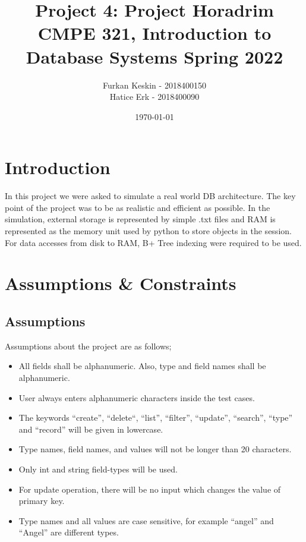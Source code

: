 \documentclass{article}
\title{\textbf{Project 4: Project Horadrim} \\ CMPE 321, Introduction to Database Systems Spring 2022}
\date{\today}
\author{Furkan Keskin - 2018400150 \\ Hatice Erk - 2018400090}
\begin{document}
\maketitle
\newpage
\tableofcontents
\newpage
\section{Introduction}
\label{sec:introduction}
In this project we were asked to simulate a real world DB architecture. The key point of the project was to be as realistic and efficient as possible. In the simulation, external storage is represented by simple .txt files and RAM is represented as the memory unit used by python to store objects in the session. For data accesses from disk to RAM, B+ Tree indexing were required to be used. 
\section{Assumptions \& Constraints}
\label{sec:ass-and-const}
\subsection{Assumptions}
Assumptions about the project are as follows;
\begin{itemize}
    \item All fields shall be alphanumeric. Also, type and field names shall be alphanumeric.
    \item User always enters alphanumeric characters inside the test cases.
    \item The keywords “create”, “delete“, “list”, “filter”, “update”, “search”, “type” and “record” will be given in lowercase.
    \item Type names, field names, and values will not be longer than 20 characters.
    \item Only int and string field-types will be used.
    \item For update operation, there will be no input which changes the value of primary key. 
    \item Type names and all values are case sensitive, for example “angel” and “Angel” are different types.
\end{itemize}
\end{document}

